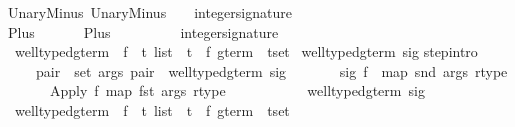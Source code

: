 \begin{isabellebody}
UnaryMinus{\isacharcolon}\ {\isachardoublequote}{\isacharparenleft}UnaryMinus{\isacharcomma}\ {\isacharparenleft}{\isacharbrackleft}{\isacharparenleft}{\isacharparenright}{\isacharbrackright}{\isacharcomma}\ {\isacharparenleft}{\isacharparenright}{\isacharparenright}{\isacharparenright}\ {\isasymin}\ integer{\isacharunderscore}signature{\isachardoublequote}\isanewline
Plus{\isacharcolon}\ \ \ \ \ \ \ {\isachardoublequote}{\isacharparenleft}Plus{\isacharcomma}\ \ \ \ \ \ \ {\isacharparenleft}{\isacharbrackleft}{\isacharparenleft}{\isacharparenright}{\isacharcomma}{\isacharparenleft}{\isacharparenright}{\isacharbrackright}{\isacharcomma}\ {\isacharparenleft}{\isacharparenright}{\isacharparenright}{\isacharparenright}\ {\isasymin}\ integer{\isacharunderscore}signature{\isachardoublequote}\isanewline
\isanewline
\isanewline
\isamarkupfalse%
\ well{\isacharunderscore}typed{\isacharunderscore}gterm\ {\isacharcolon}{\isacharcolon}\ {\isachardoublequote}{\isacharparenleft}{\isacharprime}f\ {\isasymRightarrow}\ {\isacharprime}t\ list\ {\isacharasterisk}\ {\isacharprime}t{\isacharparenright}\ {\isasymRightarrow}\ {\isacharparenleft}{\isacharprime}f\ gterm\ {\isacharasterisk}\ {\isacharprime}t{\isacharparenright}set{\isachardoublequote}\isanewline
\isamarkupfalse%
\ {\isachardoublequote}well{\isacharunderscore}typed{\isacharunderscore}gterm\ sig{\isachardoublequote}\isanewline
{}\isanewline
step{\isacharbrackleft}intro{\isacharbang}{\isacharbrackright}{\isacharcolon}\ \isanewline
\ \ \ \ {\isachardoublequote}{\isasymlbrakk}{\isasymforall}pair\ {\isasymin}\ set\ args{\isachardot}\ pair\ {\isasymin}\ well{\isacharunderscore}typed{\isacharunderscore}gterm\ sig{\isacharsemicolon}\ \isanewline
\ \ \ \ \ \ sig\ f\ {\isacharequal}\ {\isacharparenleft}map\ snd\ args{\isacharcomma}\ rtype{\isacharparenright}{\isasymrbrakk}\isanewline
\ \ \ \ \ {\isasymLongrightarrow}\ {\isacharparenleft}Apply\ f\ {\isacharparenleft}map\ fst\ args{\isacharparenright}{\isacharcomma}\ rtype{\isacharparenright}\ \isanewline
\ \ \ \ \ \ \ \ \ {\isasymin}\ well{\isacharunderscore}typed{\isacharunderscore}gterm\ sig{\isachardoublequote}\isanewline
\isanewline
\isamarkupfalse%
\ well{\isacharunderscore}typed{\isacharunderscore}gterm{\isacharprime}\ {\isacharcolon}{\isacharcolon}\ {\isachardoublequote}{\isacharparenleft}{\isacharprime}f\ {\isasymRightarrow}\ {\isacharprime}t\ list\ {\isacharasterisk}\ {\isacharprime}t{\isacharparenright}\ {\isasymRightarrow}\ {\isacharparenleft}{\isacharprime}f\ gterm\ {\isacharasterisk}\ {\isacharprime}t{\isacharparenright}set{\isachardoublequote}\isanewline

\end{isabellebody}

